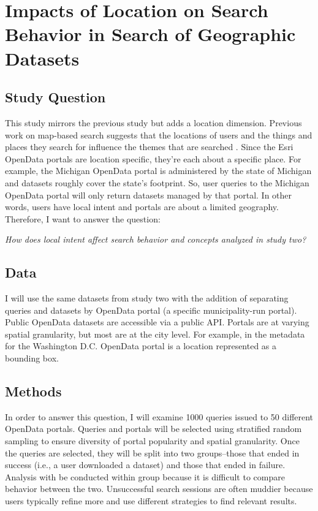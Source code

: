 \section{Impacts of Location on Search Behavior in Search of Geographic  Datasets}

\subsection{Study Question}
This study mirrors the previous study but adds a location dimension. Previous work on map-based search suggests that the locations of users and the things and places they search for influence the themes that are searched \cite{Xiao2010}. Since the Esri OpenData portals are location specific, they’re each about a specific place. For example, the Michigan OpenData portal is administered by the state of Michigan and datasets roughly cover the state’s footprint. So, user queries to the Michigan OpenData portal will only return datasets managed by that portal. In other words, users have local intent and portals are about a limited geography. Therefore, I want to answer the question:
\linebreak

\emph{How does local intent affect search behavior and concepts analyzed in study two?}
\linebreak

\subsection{Data}
I will use the same datasets from study two with the addition of separating queries and datasets by OpenData portal (a specific municipality-run portal). Public OpenData datasets are accessible via a public API. Portals are at varying spatial granularity, but most are at the city level. For example, in the metadata for the Washington D.C. OpenData portal is a location represented as a bounding box.

\subsection{Methods}
In order to answer this question, I will examine 1000 queries issued to 50 different OpenData portals. Queries and portals will be selected using stratified random sampling to ensure diversity of portal popularity and spatial granularity. Once the queries are selected, they will be split into two groups–those that ended in success (i.e., a user downloaded a dataset) and those that ended in failure. Analysis with be conducted within group because it is difficult to compare behavior between the two. Unsuccessful search sessions are often muddier because users typically refine more and use different strategies to find relevant results.

